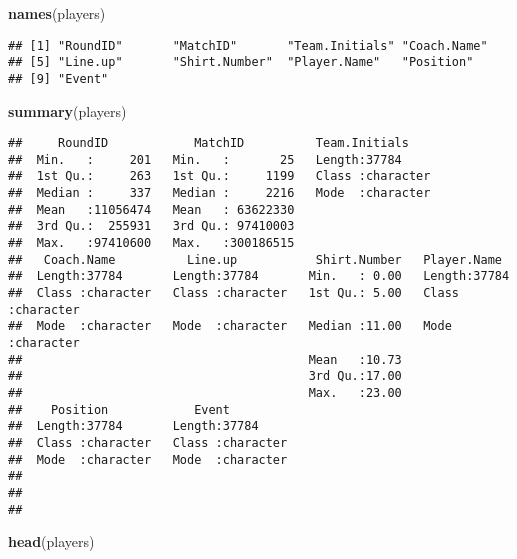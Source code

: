 \documentclass[]{article}
\newenvironment{Shaded}{\begin{snugshade}}{\end{snugshade}}
\newcommand{\KeywordTok}[1]{\textcolor[rgb]{0.13,0.29,0.53}{\textbf{#1}}}
\newcommand{\NormalTok}[1]{#1}
\begin{document}
\begin{Shaded}
\begin{Highlighting}[]
\KeywordTok{names}\NormalTok{(players)}
\end{Highlighting}
\end{Shaded}

\begin{verbatim}
## [1] "RoundID"       "MatchID"       "Team.Initials" "Coach.Name"   
## [5] "Line.up"       "Shirt.Number"  "Player.Name"   "Position"     
## [9] "Event"
\end{verbatim}

\begin{Shaded}
\begin{Highlighting}[]
\KeywordTok{summary}\NormalTok{(players)}
\end{Highlighting}
\end{Shaded}

\begin{verbatim}
##     RoundID            MatchID          Team.Initials     
##  Min.   :     201   Min.   :       25   Length:37784      
##  1st Qu.:     263   1st Qu.:     1199   Class :character  
##  Median :     337   Median :     2216   Mode  :character  
##  Mean   :11056474   Mean   : 63622330                     
##  3rd Qu.:  255931   3rd Qu.: 97410003                     
##  Max.   :97410600   Max.   :300186515                     
##   Coach.Name          Line.up           Shirt.Number   Player.Name       
##  Length:37784       Length:37784       Min.   : 0.00   Length:37784      
##  Class :character   Class :character   1st Qu.: 5.00   Class :character  
##  Mode  :character   Mode  :character   Median :11.00   Mode  :character  
##                                        Mean   :10.73                     
##                                        3rd Qu.:17.00                     
##                                        Max.   :23.00                     
##    Position            Event          
##  Length:37784       Length:37784      
##  Class :character   Class :character  
##  Mode  :character   Mode  :character  
##                                       
##                                       
## 
\end{verbatim}

\begin{Shaded}
\begin{Highlighting}[]
\KeywordTok{head}\NormalTok{(players)}
\end{Highlighting}
\end{Shaded}
\end{document}
